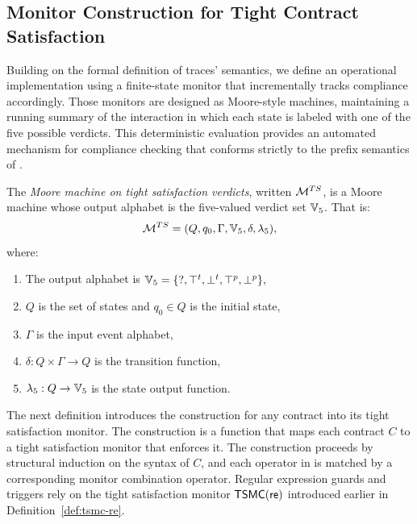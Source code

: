 \subsection{Monitor Construction for Tight Contract Satisfaction}
Building on the formal definition of \cDL traces' semantics, we define an operational implementation using a finite-state monitor that incrementally tracks compliance accordingly.
Those monitors are designed as Moore-style machines, maintaining a running summary of the interaction in which each state is labeled with one of the five possible verdicts. This deterministic evaluation provides an automated mechanism for compliance checking that conforms strictly to the prefix semantics of \cDL.
\begin{definition}
    \label{def:tightsatmon}
    The \emph{Moore machine on tight satisfaction verdicts}, written $\mathcal{M}^{TS}$, is a Moore machine whose output alphabet is the five-valued verdict set $\mathbb{V}_5 $.
    That is:
    \[
    \mathcal{M}^{TS} = (Q,q_0,\Gamma,\mathbb{V}_5 ,\delta,\lambda_{5}),
    \]
    where:
    \begin{enumerate}
    \item The output alphabet  is 
    $\mathbb{V}_5  = \{\mathsf{?},\top^t,\bot^t,\top^p,\bot^p\},$
    
    \item $Q$ is the set of states and $q_0\in Q$ is the initial state,
    \item $\Gamma$ is the input event alphabet,
    \item $\delta: Q \times \Gamma \to Q$ is the transition function,
    \item $\lambda_{5}: Q \to \mathbb{V}_5 $ is the state output function.
    \end{enumerate}
    \end{definition}

The next definition introduces the construction for any contract into its tight
satisfaction monitor. The construction is a function that maps each contract $C$ to a tight satisfaction monitor that enforces it. The construction proceeds by structural induction on the syntax of $C$, and each operator in \cDL is matched by a corresponding monitor combination operator. Regular expression guards and triggers rely on the
tight satisfaction monitor $\mathsf{TSMC}(\mathsf{re})$ introduced earlier in
Definition~\ref{def:tsmc-re}.

